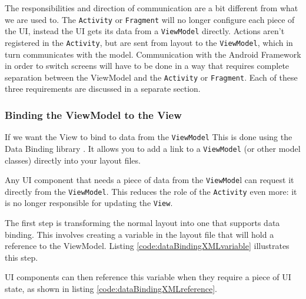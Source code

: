 The responsibilities and direction of communication are a bit different from what we are used to.
The \lstinline!Activity! or \lstinline!Fragment! will no longer configure each piece of the UI, instead the UI gets its data from a \lstinline!ViewModel! directly.
Actions aren't registered in the \lstinline!Activity!, but are sent from layout to the \lstinline!ViewModel!, which in turn communicates with the model.
Communication with the Android Framework in order to switch screens will have to be done in a way that requires complete separation between the ViewModel and the \lstinline!Activity! or \lstinline!Fragment!.
Each of these three requirements are discussed in a separate section.

\subsubsection{Binding the ViewModel to the View}
If we want the View to bind to data from the \lstinline!ViewModel! 
This is done using the Data Binding library \cite{dataBinding}.
It allows you to add a link to a \lstinline!ViewModel! (or other model classes) directly into your layout files.

Any UI component that needs a piece of data from the \lstinline!ViewMode!l can request it directly from the \lstinline!ViewModel!.
This reduces the role of the \lstinline!Activity! even more: it is no longer responsible for updating the \lstinline!View!.

The first step is transforming the normal layout into one that supports data binding.
This involves creating a variable in the layout file that will hold a reference to the ViewModel.
Listing \ref{code:dataBindingXMLvariable} illustrates this step.



UI components can then reference this variable when they require a piece of UI state, as shown in listing \ref{code:dataBindingXMLreference}.



